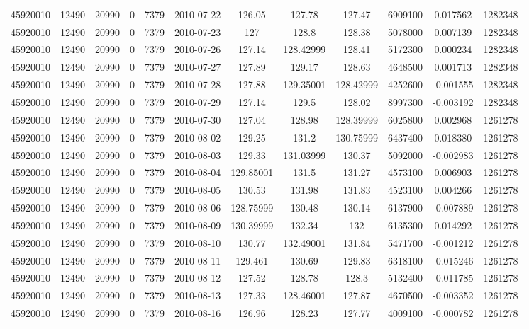 \documentclass[12 pt]{article}
\begin{document}
\begin{flushleft}
\begin{table}[h]
\begin{tabular}{c c c c c c c c c c c c }
45920010 & 12490 & 20990 & 0 & 7379 & 2010-07-22 & 126.05 & 127.78 & 127.47 & 6909100 & 0.017562 & 1282348\\
45920010 & 12490 & 20990 & 0 & 7379 & 2010-07-23 & 127 & 128.8 & 128.38 & 5078000 & 0.007139 & 1282348\\
45920010 & 12490 & 20990 & 0 & 7379 & 2010-07-26 & 127.14 & 128.42999 & 128.41 & 5172300 & 0.000234 & 1282348\\
45920010 & 12490 & 20990 & 0 & 7379 & 2010-07-27 & 127.89 & 129.17 & 128.63 & 4648500 & 0.001713 & 1282348\\
45920010 & 12490 & 20990 & 0 & 7379 & 2010-07-28 & 127.88 & 129.35001 & 128.42999 & 4252600 & -0.001555 & 1282348\\
45920010 & 12490 & 20990 & 0 & 7379 & 2010-07-29 & 127.14 & 129.5 & 128.02 & 8997300 & -0.003192 & 1282348\\
45920010 & 12490 & 20990 & 0 & 7379 & 2010-07-30 & 127.04 & 128.98 & 128.39999 & 6025800 & 0.002968 & 1261278\\
45920010 & 12490 & 20990 & 0 & 7379 & 2010-08-02 & 129.25 & 131.2 & 130.75999 & 6437400 & 0.018380 & 1261278\\
45920010 & 12490 & 20990 & 0 & 7379 & 2010-08-03 & 129.33 & 131.03999 & 130.37 & 5092000 & -0.002983 & 1261278\\
45920010 & 12490 & 20990 & 0 & 7379 & 2010-08-04 & 129.85001 & 131.5 & 131.27 & 4573100 & 0.006903 & 1261278\\
45920010 & 12490 & 20990 & 0 & 7379 & 2010-08-05 & 130.53 & 131.98 & 131.83 & 4523100 & 0.004266 & 1261278\\
45920010 & 12490 & 20990 & 0 & 7379 & 2010-08-06 & 128.75999 & 130.48 & 130.14 & 6137900 & -0.007889 & 1261278\\
45920010 & 12490 & 20990 & 0 & 7379 & 2010-08-09 & 130.39999 & 132.34 & 132 & 6135300 & 0.014292 & 1261278\\
45920010 & 12490 & 20990 & 0 & 7379 & 2010-08-10 & 130.77 & 132.49001 & 131.84 & 5471700 & -0.001212 & 1261278\\
45920010 & 12490 & 20990 & 0 & 7379 & 2010-08-11 & 129.461 & 130.69 & 129.83 & 6318100 & -0.015246 & 1261278\\
45920010 & 12490 & 20990 & 0 & 7379 & 2010-08-12 & 127.52 & 128.78 & 128.3 & 5132400 & -0.011785 & 1261278\\
45920010 & 12490 & 20990 & 0 & 7379 & 2010-08-13 & 127.33 & 128.46001 & 127.87 & 4670500 & -0.003352 & 1261278\\
45920010 & 12490 & 20990 & 0 & 7379 & 2010-08-16 & 126.96 & 128.23 & 127.77 & 4009100 & -0.000782 & 1261278\\

\end{tabular}
\end{table}
\end{flushleft}
\end{document}

